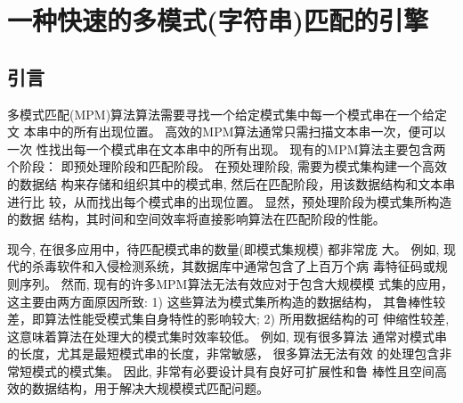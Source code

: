 





\chapter{一种快速的多模式(字符串)匹配的引擎}

\section{引言}
\label{sec:introduction}


多模式匹配(MPM)算法算法需要寻找一个给定模式集中每一个模式串在一个给定文
本串中的所有出现位置。 高效的MPM算法通常只需扫描文本串一次，便可以一次
性找出每一个模式串在文本串中的所有出现。 现有的MPM算法主要包含两个阶段：
即预处理阶段和匹配阶段。 在预处理阶段, 需要为模式集构建一个高效的数据结
构来存储和组织其中的模式串, 然后在匹配阶段，用该数据结构和文本串进行比
较，从而找出每个模式串的出现位置。 显然，预处理阶段为模式集所构造的数据
结构，其时间和空间效率将直接影响算法在匹配阶段的性能。

现今, 在很多应用中，待匹配模式串的数量(即模式集规模) 都非常庞
大。 例如, 现代的杀毒软件和入侵检测系统，其数据库中通常包含了上百万个病
毒特征码或规则序列。 然而, 现有的许多MPM算法无法有效应对于包含大规模模
式集的应用，这主要由两方面原因所致: 1) 这些算法为模式集所构造的数据结构，
其鲁棒性较差，即算法性能受模式集自身特性的影响较大; 2) 所用数据结构的可
伸缩性较差, 这意味着算法在处理大的模式集时效率较低。 例如, 现有很多算法
通常对模式串的长度，尤其是最短模式串的长度，非常敏感， 很多算法无法有效
的处理包含非常短模式的模式集。 因此, 非常有必要设计具有良好可扩展性和鲁
棒性且空间高效的数据结构，用于解决大规模模式匹配问题。

